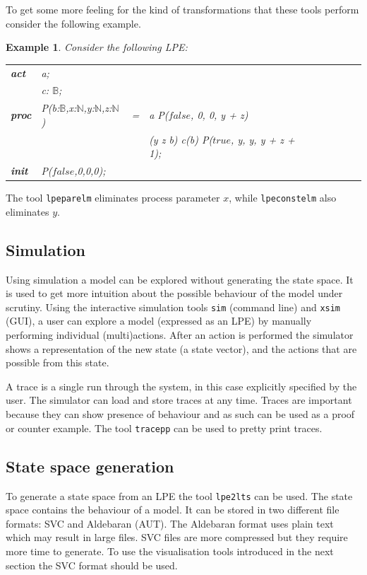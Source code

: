 \documentclass[a4paper,fleqn]{article}
\makeatletter
\newtheorem{thexample}[thdefinition]{Example}
\newenvironment{example}
  {\begin{thexample}\em}
  {\end{thexample}}
\newcommand{\f}[1]{\ensuremath{\mathit{#1}}}
\newcommand{\bool}{\ensuremath{\mathbb{B}}}
\newcommand{\true}{\ensuremath{\f{true}}}
\newcommand{\false}{\ensuremath{\f{false}}}
\newcommand{\nat}{\ensuremath{\mathbb{N}}}
\newcommand{\seq}{\mathbin{\cdot}}
\newcommand{\alt}{\mathbin{+}}
\newcommand{\ap}{{:}}
\newenvironment{mcrl2}%
{\par\bigskip\noindent%
 \begin{tabular}{@{}>{\bf}p{2.3em}L@{\ }L@{\ }L@{\ }L@{\ }L@{\ }L@{\ }L@{\ }L}%
}%
{\end{tabular}\bigskip\par%
}
\makeatother
\begin{document}
To get some more feeling for the kind of transformations that these tools
perform consider the following example.
\begin{example}
Consider the following LPE:
\begin{mcrl2}
act  & a;\\
     & c: \bool;\\
proc & P(b\ap\bool,x\ap\nat,y\ap\nat,z\ap\nat)
       &    = & a {\seq} P(\false, 0, 0, y + z)\\
     & & \alt & (y \not\approx z \lor \neg b) \to c(b) {\seq} P(\true, y, y, y + z + 1);\\
init & P(\false,0,0,0);
\end{mcrl2}
\end{example}
The tool \texttt{lpeparelm} eliminates process parameter $x$, while \texttt{lpeconstelm}
also eliminates $y$.

\subsection{Simulation}

Using simulation a model can be explored without generating the state space.
It is used to get more intuition about the possible behaviour of the model
under scrutiny.  Using the interactive simulation tools \texttt{sim} (command
line) and \texttt{xsim} (GUI), a user can explore a model (expressed as an LPE)
by manually performing individual (multi)actions. After an action is performed
the simulator shows a representation of the new state (a state vector), and the
actions that are possible from this state.

A trace is a single run through the system, in this case explicitly specified
by the user.  The simulator can load and store traces at any time. Traces are
important because they can show presence of behaviour and as such can be used
as a proof or counter example. The tool \texttt{tracepp} can be used to pretty
print traces.

\subsection{State space generation}

To generate a state space from an LPE the tool \texttt{lpe2lts} can be used.
The state space contains the behaviour of a model.  It can be stored in two
different file formats: SVC and Aldebaran (AUT).  The Aldebaran format uses
plain text which may result in large files. SVC files are more compressed but
they require more time to generate. To use the visualisation tools introduced
in the next section the SVC format should be used.
\end{document}
